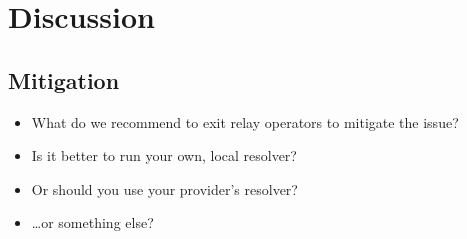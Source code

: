 \section{Discussion}
\label{sec:discussion}

\subsection{Mitigation}
\begin{itemize}
	\item What do we recommend to exit relay operators to mitigate the issue?
	\item Is it better to run your own, local resolver?
	\item Or should you use your provider's resolver?
	\item \ldots or something else?
\end{itemize}
